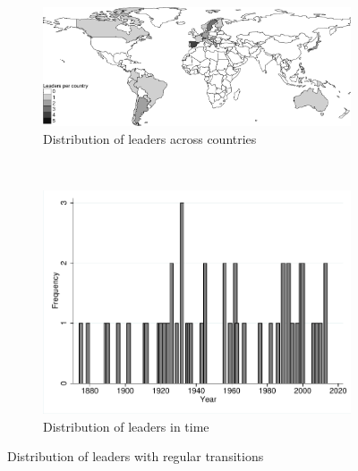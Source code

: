 \begin{figure}[H]
    \centering
    \begin{subfigure}[b]{\textwidth}
        \includegraphics[width=\textwidth]{Figures/World50ex_vsimple.pdf}
        \caption{Distribution of leaders across countries}
        \label{fig:world_map_50}
    \end{subfigure}
    \\ %
    \begin{subfigure}[b]{0.8\textwidth}
        \includegraphics[width=\textwidth]{Figures/Year_50ex.pdf}
        \caption{Distribution of leaders in time}
        \label{fig:timeline_50}
    \end{subfigure}
    \caption{Distribution of leaders with regular transitions}
    \label{fig:robust_dist}
    \medskip %
\end{figure}
